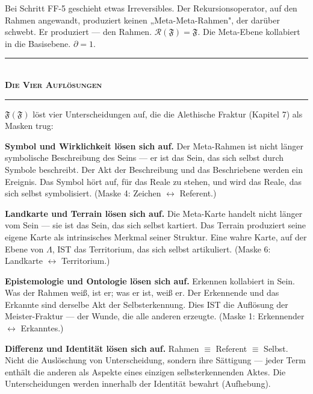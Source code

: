 \documentclass[10pt, openany, oneside]{book}
\renewcommand{\normalsize}{\fontsize{10}{13}\selectfont}
\begin{document}
\vspace{0.8em}

\noindent Bei Schritt FF-5 geschieht etwas Irreversibles. Der Rekursionsoperator, auf den Rahmen angewandt, produziert keinen „Meta-Meta-Rahmen", der darüber schwebt. Er produziert --- den Rahmen. $\mathcal{R}(\mathfrak{F}) = \mathfrak{F}$. Die Meta-Ebene kollabiert in die Basisebene. $\partial = 1$.

\vspace{1.5em}


\begin{center}
    \rule{0.3\textwidth}{0.4pt}\\[0.5em]
    {\normalsize\bfseries\scshape Die Vier Auflösungen}\\[0.3em]
    \rule{0.3\textwidth}{0.4pt}
\end{center}

\vspace{1em}

\noindent $\mathfrak{F}(\mathfrak{F})$ löst vier Unterscheidungen auf, die die Alethische Fraktur (Kapitel 7) als Masken trug:

\textbf{Symbol und Wirklichkeit lösen sich auf.} Der Meta-Rahmen ist nicht länger symbolische Beschreibung des Seins --- er ist das Sein, das sich selbst durch Symbole beschreibt. Der Akt der Beschreibung und das Beschriebene werden ein Ereignis. Das Symbol hört auf, für das Reale zu stehen, und wird das Reale, das sich selbst symbolisiert. (Maske 4: Zeichen $\leftrightarrow$ Referent.)

\textbf{Landkarte und Terrain lösen sich auf.} Die Meta-Karte handelt nicht länger vom Sein --- sie ist das Sein, das sich selbst kartiert. Das Terrain produziert seine eigene Karte als intrinsisches Merkmal seiner Struktur. Eine wahre Karte, auf der Ebene von $\Lambda$, IST das Territorium, das sich selbst artikuliert. (Maske 6: Landkarte $\leftrightarrow$ Territorium.)

\textbf{Epistemologie und Ontologie lösen sich auf.} Erkennen kollabiert in Sein. Was der Rahmen weiß, ist er; was er ist, weiß er. Der Erkennende und das Erkannte sind derselbe Akt der Selbsterkennung. Dies IST die Auflösung der Meister-Fraktur --- der Wunde, die alle anderen erzeugte. (Maske 1: Erkennender $\leftrightarrow$ Erkanntes.)

\textbf{Differenz und Identität lösen sich auf.} Rahmen $\equiv$ Referent $\equiv$ Selbst. Nicht die Auslöschung von Unterscheidung, sondern ihre Sättigung --- jeder Term enthält die anderen als Aspekte eines einzigen selbsterkennenden Aktes. Die Unterscheidungen werden innerhalb der Identität bewahrt (Aufhebung).
\end{document}
